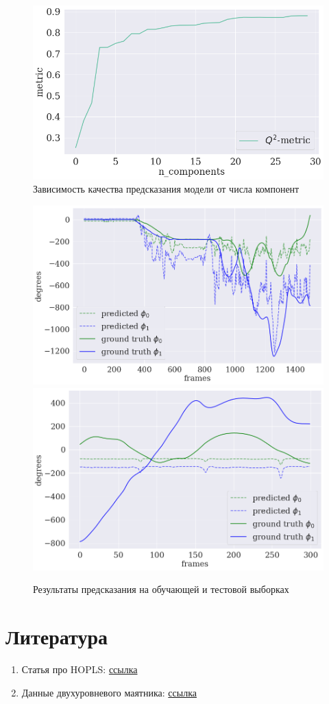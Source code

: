 \documentclass[a4paper,14pt]{article}
\theoremstyle{plain} %
\theoremstyle{definition} %
\theoremstyle{remark} %
\begin{document}
	\begin{figure}[bhtp]
		\centering
		\includegraphics[width=0.8\linewidth]{metric-vs-components}
		\caption{Зависимость качества предсказания модели от числа компонент}
		\label{fig:metric_vs_components}
	\end{figure}

	\begin{figure}[bhtp]
		\centering
		\includegraphics[width=0.7\linewidth]{train_example}
		\includegraphics[width=0.7\linewidth]{test_example}
		\caption{Результаты предсказания на обучающей и тестовой выборках}
		\label{fig:train_and_test}
	\end{figure}

	\section{Литература}
	\begin{enumerate}
		\item Статья про HOPLS: \href{https://ieeexplore.ieee.org/stamp/stamp.jsp?arnumber=6365194}{ссылка}  
		\item Данные двухуровневого маятника: \href{https://www.sciencedirect.com/science/article/pii/S246806722030047X}{ссылка}
	\end{enumerate}
\end{document}
